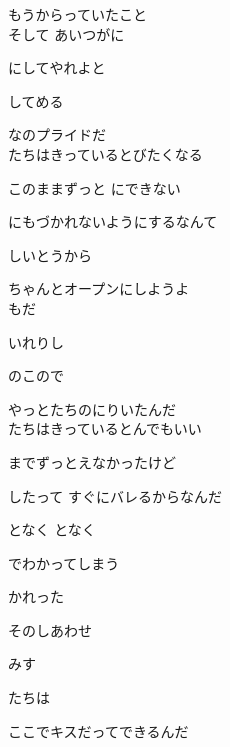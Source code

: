 もうからっていたこと
\\

そして あいつがに

にしてやれよと

してめる

なのプライドだ
\\

たちはきっているとびたくなる

このままずっと にできない

にもづかれないようにするなんて

しいとうから

ちゃんとオープンにしようよ
\\

もだ

いれりし

のこので

やっとたちのにりいたんだ
\\

たちはきっているとんでもいい

までずっとえなかったけど

したって すぐにバレるからなんだ

となく となく

でわかってしまう

かれった

そのしあわせ

みす

 たちは

ここでキスだってできるんだ
\\
